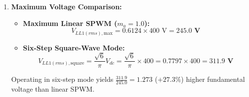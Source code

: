 \documentclass[11pt,a4paper]{article}
\begin{document}
\begin{examplebox}
\begin{enumerate}
  \item \textbf{Maximum Voltage Comparison:}
  \begin{itemize}
    \item \textbf{Maximum Linear SPWM ($m_a = 1.0$):}
    \begin{equation*}
    V_{LL1(rms),\text{max}} = 0.6124 \times 400\text{ V} = \mathbf{245.0\text{ V}}
    \end{equation*}
    \item \textbf{Six-Step Square-Wave Mode:}
    \begin{equation*}
    V_{LL1(rms),\text{square}} = \frac{\sqrt{6}}{\pi} V_{dc} = \frac{\sqrt{6}}{\pi} \times 400 = 0.7797 \times 400 = \mathbf{311.9\text{ V}}
    \end{equation*}
  \end{itemize}
  Operating in six-step mode yields $\frac{311.9}{245.0} = 1.273$ ($+27.3\%$) higher fundamental voltage than linear SPWM.
\end{enumerate}
\end{examplebox}
\end{document}
